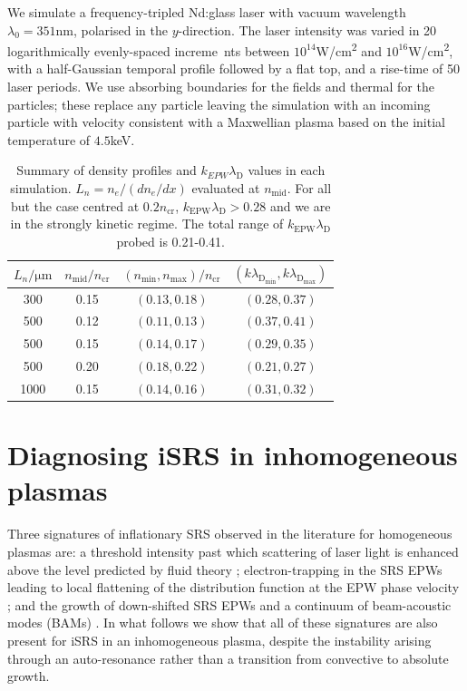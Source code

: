 We simulate a frequency-tripled Nd:glass laser with vacuum wavelength $\lambda_0 = 351\si{\nano\metre}$, polarised in the $y$-direction. The laser intensity was varied in 20 logarithmically evenly-spaced increme\
nts between $10^{14}$\si{W/\centi\metre^2} and $10^{16}$\si{W/\centi\metre^2}, with a half-Gaussian temporal profile followed by a flat top, and a rise-time of 50 laser periods.
We use absorbing boundaries for the fields and thermal for the particles; these replace any particle leaving the
simulation with an incoming particle with velocity consistent with a Maxwellian plasma based on the initial temperature of $4.5$\si{keV}.

\begin{table}[ht]
    \caption{\label{tab:densities}
        Summary of density profiles and $k_{EPW}\lambda_\mathrm{D}$ values in each simulation. $L_n=n_e/(dn_e/dx)$ evaluated at $n_\mathrm{mid}$. For all but the case centred at $0.2n_\mathrm{cr}$, $k_\mathrm{EPW}\lambda_\mathrm{D} > 0.28$ and we are in the strongly kinetic regime. The total range of $k_\mathrm{EPW}\lambda_\mathrm{D}$ probed is 0.21-0.41.
        }
    \begin{center}
    \begin{tabular}{|c|c|c|c|}
    $L_n/\si{\micro \metre}$  & $n_\mathrm{mid}/n_\mathrm{cr}$ & $(n_\mathrm{min},n_\mathrm{max})/n_\mathrm{cr}$ &$(k\lambda_\mathrm{D_{min}},k\lambda_\mathrm{D_{max}})$\\
    \hline
    300& 0.15  & $(0.13,0.18)$ & $(0.28,0.37)$\\
    500 & 0.12 &$(0.11,0.13)$ & $(0.37,0.41)$\\
    500 & 0.15 & $(0.14,0.17)$& $(0.29,0.35)$ \\
    500 & 0.20 & $(0.18,0.22)$& $(0.21,0.27)$\\
    1000 & 0.15 & $(0.14,0.16)$ & $(0.31,0.32)$ \\
    \end{tabular}
    \end{center}
\end{table}

\section{Diagnosing iSRS in inhomogeneous plasmas}\label{sec:signatures}
Three signatures of inflationary SRS observed in the literature for homogeneous plasmas are: a threshold intensity past which scattering of laser light is enhanced above the level predicted by fluid theory \cite{Vu2007}; electron-trapping in the SRS EPWs leading to local flattening of the distribution function at the EPW phase velocity \cite{Vu2002}; and the growth of down-shifted SRS EPWs and a continuum of beam-acoustic modes (BAMs) \cite{Yin2006}.
In what follows we show that all of these signatures are also present for iSRS in an inhomogeneous plasma, despite the instability arising through an auto-resonance rather than a transition from convective to absolute growth.

